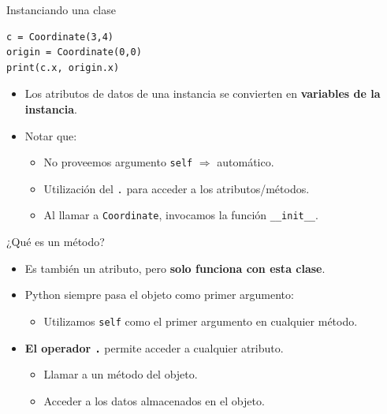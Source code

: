 \documentclass[mathserif]{beamer}
\begin{document}
\begin{frame}[fragile]{Instanciando una clase}
\begin{lstlisting}
c = Coordinate(3,4)
origin = Coordinate(0,0)
print(c.x, origin.x)
\end{lstlisting}

    \begin{itemize}
        \item Los atributos de datos de una instancia se convierten en {\orange\bfseries variables de la instancia}.
        
        \item Notar que:
        \begin{itemize}
            \item No proveemos argumento \lstinline|self| $\Rightarrow$ automático.
            \item Utilización del \lstinline|.| para acceder a los atributos/métodos.
            \item Al llamar a \lstinline|Coordinate|, invocamos la función \lstinline|__init__|.
        \end{itemize}
    \end{itemize}
\end{frame}

\begin{frame}[fragile]{¿Qué es un método?}
    \begin{itemize}
        \item Es también un atributo, pero {\orange\bfseries solo funciona con esta clase}.
        
        \item Python siempre pasa el objeto como primer argumento:
        \begin{itemize}
            \item Utilizamos \lstinline|self| como el primer argumento en cualquier método.
        \end{itemize}
        
        \item {\blue\bfseries El operador \lstinline|.|} permite acceder a cualquier atributo. 
        \begin{itemize}
            \item Llamar a un método del objeto.
            \item Acceder a los datos almacenados en el objeto.
        \end{itemize}
    \end{itemize}
\end{frame}
\end{document}
